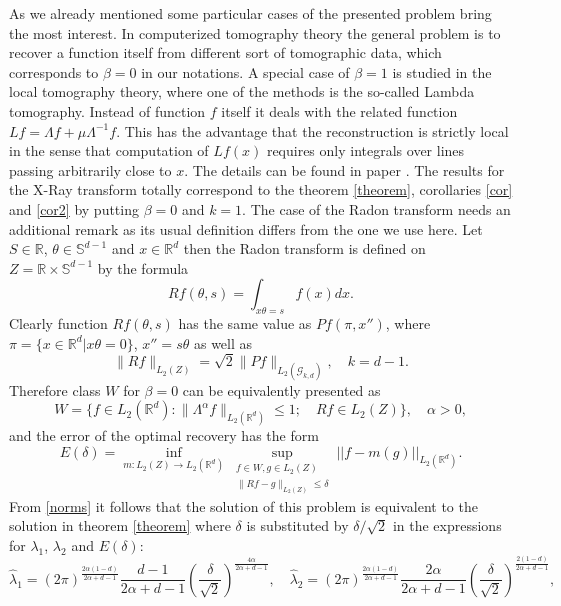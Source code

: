 \documentclass[12pt]{iopart}
\begin{document}
	As we already mentioned some particular cases of the presented problem bring the most interest. In computerized tomography theory the general problem is to recover a function itself from different sort of tomographic data, which corresponds to $\beta=0$ in our notations. A special case of $\beta=1$ is studied in the local tomography theory, where one of the methods is the so-called Lambda tomography. Instead of function $f$ itself it deals with the related function $Lf = \Lambda f+\mu\Lambda^{-1}f$. This has the advantage that the reconstruction is strictly local in the sense that computation of $Lf(x)$ requires only integrals over lines passing arbitrarily close to $x$. The details can be found in paper \cite{FKNRS}.
	The results for the X-Ray transform totally correspond to the theorem \ref{theorem}, corollaries \ref{cor} and \ref{cor2} by putting $\beta=0$ and $k=1$. The case of the Radon transform needs an additional remark as its usual definition differs from the one we use here. Let $S\in\mathbb R$, $\theta\in\mathbb S^{d-1}$ and $x\in\mathbb R^d$ then the Radon transform is defined on $Z=\mathbb R\times\mathbb S^{d-1}$ by the formula 
	$$Rf(\theta,s)=\int_{x\theta=s}f(x)dx.$$
	Clearly function $Rf(\theta,s)$ has the same value as $Pf(\pi,x'')$, where $\pi=\{x\in\mathbb R^d | x\theta=0\}$, $x''=s\theta$ as well as
	\begin{equation}
	\label{norms}
	\|Rf\|_{L_2(Z)}=\sqrt{2}\|Pf\|_{L_2(\mathcal G_{k,d})},\quad k=d-1.
	\end{equation}
	Therefore class $W$ for $\beta=0$ can be equivalently presented as 
	$$ W=\{f\in L_2(\mathbb R^d) :
	\|\Lambda^\alpha f\|_{L_2(\mathbb R^d)}\leqslant  1;\quad Rf\in L_2(Z) \},\quad\alpha>0,$$
	and the error of the optimal recovery has the form
	$$
	E(\delta)=\inf_{m:L_2(Z)\rightarrow L_2(\mathbb R^d)}\sup_{
		\begin{smallmatrix}
		f\in W, g\in L_2(Z)\\ 
		\|Rf-g\|_{L_2(Z)}\leqslant \delta
		\end{smallmatrix}} ||f-m(g)||_{L_2(\mathbb R^d)}.
	$$
	From \eqref{norms} it follows that the solution of this problem is equivalent to the solution in theorem \ref{theorem} where $\delta$ is substituted by $\delta/\sqrt{2}$ in the expressions for $\lambda_1$, $\lambda_2$ and $E(\delta)$:
	$$
	\widehat\lambda_1=(2\pi)^{\frac{2\alpha(1-d)}{2\alpha+d-1}}\frac{d-1}{2\alpha+d-1}\left(\frac{\delta}{\sqrt{2}}\right)^\frac{4\alpha}{2\alpha+d-1},\quad \widehat\lambda_2=(2\pi)^{\frac{2\alpha(1-d)}{2\alpha+d-1}}\frac{2\alpha}{2\alpha+d-1}\left(\frac{\delta}{\sqrt{2}}\right)^\frac{2(1-d)}{2\alpha+d-1}, 
	$$
\end{document}
